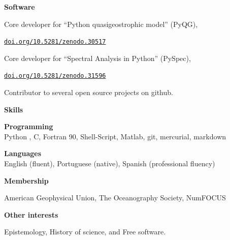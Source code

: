 \documentclass[a4paper,11pt,final]{memoir}
\newcommand{\Sep}{\vspace{1.25em}}
\newcommand{\SmallSep}{\vspace{0.5em}}
\newcommand{\CVSection}[1]
    {\Large\textbf{#1}\par
    \SmallSep\normalsize\normalfont}
\newcommand{\CVItem}[1]
    {\textbf{\color{NavyBlue} #1}}
\begin{document}
\Sep

%
%

\CVSection{Software}

Core developer for ``Python quasigeostrophic model'' (PyQG),

\href{http://dx.doi.org/10.5281/zenodo.30517}{\texttt{doi.org/10.5281/zenodo.30517}}

\SmallSep

Core developer for ``Spectral Analysis in Python'' (PySpec),

\SmallSep

\href{http://dx.doi.org/10.5281/zenodo.31596}{\texttt{doi.org/10.5281/zenodo.31596}}

\SmallSep

Contributor to several open source projects on github.

\Sep


\Sep

\CVSection{Skills}

\CVItem{Programming}\\
Python , C, Fortran 90, Shell-Script, Matlab, git, mercurial, markdown

\SmallSep

\CVItem{Languages}\\
English (fluent), Portuguese (native), Spanish (professional fluency)

\Sep

\CVSection{Membership}

 American Geophysical Union, The Oceanography Society, NumFOCUS

\Sep

\CVSection{Other interests}

Epistemology, History of science, and Free software.
%
%
%
%
%
%
%
%
\end{document}
